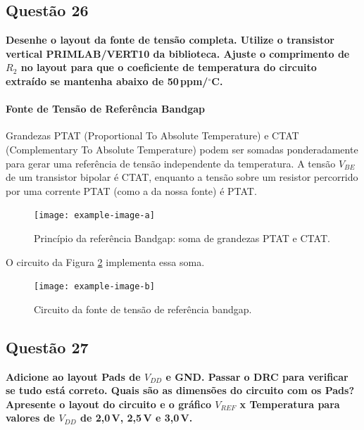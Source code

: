 \documentclass[12pt,a4paper]{article}
\newcommand{\degree}{\ensuremath{{}^\circ}}
\begin{document}
\subsection*{Questão 26}

	\textbf{Desenhe o layout da fonte de tensão completa. Utilize o transistor vertical PRIMLAB/VERT10 da biblioteca. Ajuste o comprimento de $R_2$ no layout para que o coeficiente de temperatura do circuito extraído se mantenha abaixo de 50\,ppm/\degree C.}


\paragraph*{Fonte de Tensão de Referência Bandgap}

Grandezas PTAT (Proportional To Absolute Temperature) e CTAT (Complementary To Absolute Temperature) podem ser somadas ponderadamente para gerar uma referência de tensão independente da temperatura. A tensão $V_{BE}$ de um transistor bipolar é CTAT, enquanto a tensão sobre um resistor percorrido por uma corrente PTAT (como a da nossa fonte) é PTAT.

\begin{figure}[H]
\centering
\texttt{[image: example-image-a]}
\caption{Princípio da referência Bandgap: soma de grandezas PTAT e CTAT.}
\label{fig:bandgap_principle}
\end{figure}

O circuito da Figura \ref{fig:bandgap_circuit} implementa essa soma.

\begin{figure}[H]
\centering
\texttt{[image: example-image-b]}
\caption{Circuito da fonte de tensão de referência bandgap.}
\label{fig:bandgap_circuit}
\end{figure}

\subsection*{Questão 27}
	\textbf{Adicione ao layout Pads de $V_{DD}$ e GND. Passar o DRC para verificar se tudo está correto. Quais são as dimensões do circuito com os Pads? Apresente o layout do circuito e o gráfico $V_{REF}$ x Temperatura para valores de $V_{DD}$ de 2{,}0\,V, 2{,}5\,V e 3{,}0\,V.}
\end{document}
